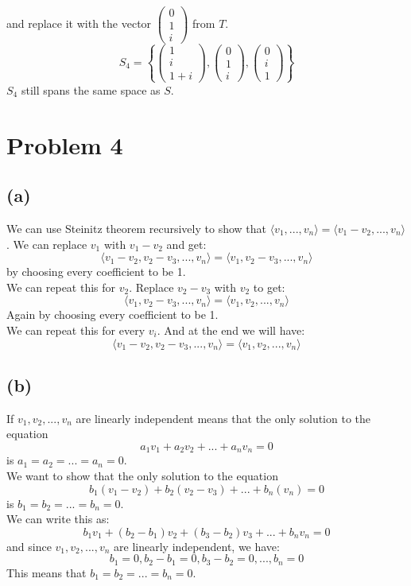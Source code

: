 \documentclass{article}
\begin{document}
\) and replace it with the vector \(
   \begin{pmatrix}
      0 \\
      1 \\
      i
   \end{pmatrix}
\) from \(T\).
\[
   S_4 = \left\{
      \begin{pmatrix}
         1 \\
         i \\
         1 + i
      \end{pmatrix},
      \begin{pmatrix}
         0 \\
         1 \\
         i
      \end{pmatrix},
      \begin{pmatrix}
         0 \\
         i \\
         1
      \end{pmatrix}
   \right\}
\]
\(S_4\) still spans the same space as \(S\).

\section*{Problem 4}
\subsection*{(a)}
We can use Steinitz theorem recursively to show that \(\langle v_1, ..., v_n\rangle = \langle v_1-v_2, ..., v_n \rangle\).
We can replace \(v_1\) with \(v_1 - v_2\) and get:
\[
   \langle v_1 - v_2, v_2 - v_3, ..., v_n \rangle = \langle v_1, v_2 -v_3, ..., v_n \rangle
\]
by choosing every coefficient to be 1. \\
We can repeat this for \(v_2\). Replace \(v_2 - v_3\) with \(v_2\) to get:
\[
   \langle v_1, v_2 -v_3, ..., v_n \rangle = \langle v_1, v_2, ..., v_n \rangle
\]
Again by choosing every coefficient to be 1. \\
We can repeat this for every \(v_i\). And at the end we will have:
\[
   \langle v_1 - v_2, v_2 - v_3, ..., v_n \rangle = \langle v_1, v_2, ..., v_n \rangle
\]

\subsection*{(b)}
If \(v_1, v_2, ..., v_n\) are linearly independent means that the only solution to the equation
\[
   a_1 v_1 + a_2 v_2 + ... + a_n v_n = 0
\]
is \(a_1 = a_2 = ... = a_n = 0\). \\

We want to show that the only solution to the equation
\[
   b_1 (v_1 - v_2) + b_2 (v_2 - v_3) + ... + b_n (v_n) = 0
\]
is \(b_1 = b_2 = ... = b_n = 0\). \\
We can write this as:
\[
   b_1 v_1 + (b_2 - b_1) v_2 + (b_3 - b_2) v_3 + ... + b_n v_n = 0
\]
and since \(v_1, v_2, ..., v_n\) are linearly independent, we have:
\[
   b_1 = 0, b_2 - b_1 = 0, b_3 - b_2 = 0, ..., b_n = 0
\]
   This means that \(b_1 = b_2 = ... = b_n = 0\).
\end{document}
